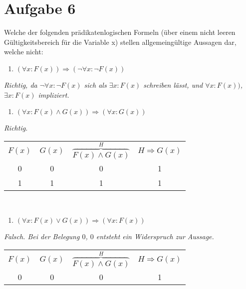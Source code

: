 \section*{Aufgabe 6}

Welche der folgenden prädikatenlogischen Formeln (über einem nicht leeren Gültigkeitsbereich für die Variable x) stellen allgemeingültige Aussagen dar, welche nicht:

\begin{enumerate}[label={a)}, leftmargin=*]
\item $(\forall x : F(x)) \Rightarrow (\lnot \forall x : \lnot F(x))$
\end{enumerate}

\textit{Richtig, da $\lnot \forall x : \lnot F(x)$ sich als $\exists x : F(x)$ schreiben lässt, und $\forall x : F(x))$, $\exists x : F(x)$ impliziert.}

\begin{enumerate}[label={b)}, leftmargin=*]
\item $(\forall x : F(x) \land G(x)) \Rightarrow (\forall x : G(x))$
\end{enumerate}

\textit{Richtig.}\\

\begin{table}[h]
\centering
\begin{tabular}{c|c|c|c}
$F(x)$ & $G(x)$ & $\overbrace{F(x) \land G(x)}^{H}$ & $H \Rightarrow G(x)$\\
0 & 0 & 0 & 1\\
1 & 1 & 1 & 1
\end{tabular}
\end{table}\

\begin{enumerate}[label={c)}, leftmargin=*]
\item $(\forall x : F(x) \lor G(x)) \Rightarrow (\forall x : F(x))$
\end{enumerate}

\textit{Falsch. Bei der Belegung $0$, $0$ entsteht ein Widerspruch zur Aussage.}

\begin{table}[h]
\centering
\begin{tabular}{c|c|c|c}
$F(x)$ & $G(x)$ & $\overbrace{F(x) \land G(x)}^{H}$ & $H \Rightarrow G(x)$\\
0 & 0 & 0 & 1\\
\end{tabular}
\end{table}\


